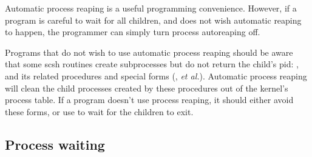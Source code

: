 %

Automatic process reaping is a useful programming convenience.
However, if a program is careful to wait for all children, and does not wish
automatic reaping to happen, the programmer can simply turn process
autoreaping off.

Programs that do not wish to use automatic process reaping should be
aware that some scsh routines create subprocesses but do not return
the child's pid: , and its related procedures and
special forms (, \emph{et al.}).
Automatic process reaping will clean the child processes created by
these procedures out of the kernel's process table.
If a program doesn't use process reaping, it should either avoid these
forms, or use  to wait for the children to exit.

\subsection{Process waiting}

